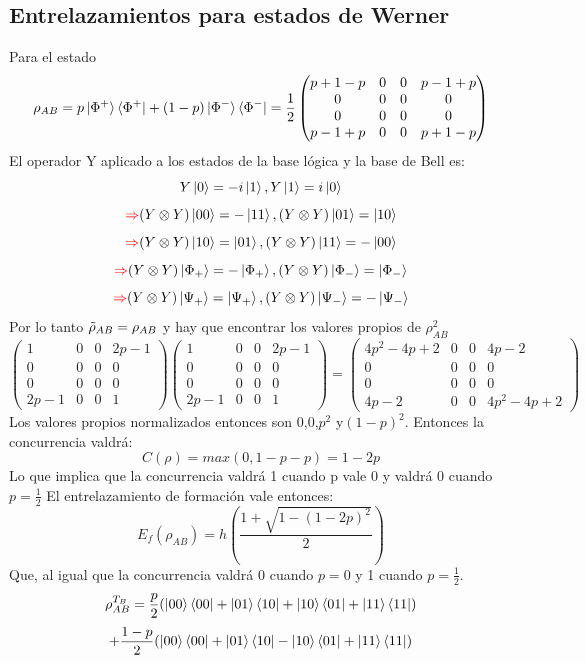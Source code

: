 \documentclass{book}
\begin{document}
\subsection{Entrelazamientos para estados de Werner} Para el estado $$\rho_{AB}=p\ket{\Phi^+}\bra{\Phi^+}+(1-p)\ket{\Phi^-}\bra{\Phi^-}=\frac{1}{2}\begin{pmatrix}p+1-p&0&0&p-1+p\\0&0&0&0\\0&0&0&0\\p-1+p&0&0&p+1-p\end{pmatrix} $$
El operador Y aplicado a los estados de la base lógica y la base de Bell es:
$$ Y\ket{0}=-i\ket{1}, Y\ket{1}=i\ket{0} $$
$$\textcolor{red}{\Rightarrow} (Y\otimes Y)\ket{00}=-\ket{11},(Y\otimes Y)\ket{01}=\ket{10} $$
$$\textcolor{red}{\Rightarrow} (Y\otimes Y)\ket{10}=\ket{01},(Y\otimes Y)\ket{11}=-\ket{00} $$
$$\textcolor{red}{\Rightarrow} (Y\otimes Y)\ket{\Phi_+}=-\ket{\Phi_+},(Y\otimes Y)\ket{\Phi_-}=\ket{\Phi_-}$$
$$\textcolor{red}{\Rightarrow} (Y\otimes Y)\ket{\Psi_+}=\ket{\Psi_+},(Y\otimes Y)\ket{\Psi_-}=-\ket{\Psi_-}$$
Por lo tanto $\Tilde{\rho}_{AB}=\rho_{AB}$ y hay que encontrar los valores propios de $\rho_{AB}^2$
$$\begin{pmatrix}1&0&0&2p-1\\0&0&0&0\\0&0&0&0\\2p-1&0&0&1\end{pmatrix}\begin{pmatrix}1&0&0&2p-1\\0&0&0&0\\0&0&0&0\\2p-1&0&0&1\end{pmatrix}=\begin{pmatrix}4p^2-4p+2&0&0&4p-2\\0&0&0&0\\0&0&0&0\\4p-2&0&0&4p^2-4p+2\end{pmatrix}$$
Los valores propios normalizados entonces son $0$,$0$,$p^2$ y$(1-p)^2$. Entonces la concurrencia valdrá:
$$C(\rho)=max(0,1-p-p)=1-2p$$
Lo que implica que la concurrencia valdrá 1 cuando p vale 0 y valdrá 0 cuando $p=\frac{1}{2}$ El entrelazamiento de formación vale entonces:
$$E_f(\rho_{AB})=h(\frac{1+\sqrt{1-(1-2p)^2}}{2})$$ Que, al igual que la concurrencia valdrá 0 cuando $p=0$ y 1 cuando $p=\frac{1}{2}$.
$$\rho_{AB}^{T_B}=\frac{p}{2}(\ket{00}\bra{00}+\ket{01}\bra{10}+\ket{10}\bra{01}+\ket{11}\bra{11})$$ $$+\frac{1-p}{2}(\ket{00}\bra{00}+\ket{01}\bra{10}-\ket{10}\bra{01}+\ket{11}\bra{11})$$
\end{document}
